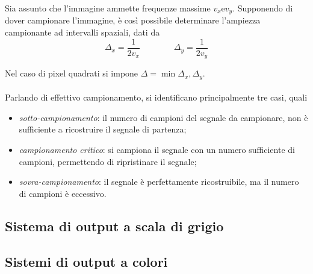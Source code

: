 \documentclass{subfiles}
\begin{document}
Sia assunto che l'immagine ammette frequenze massime \(v_{x} \text{e} v_{y}\).
Supponendo di dover campionare l'immagine, è così possibile determinare l'ampiezza campionante ad intervalli spaziali, dati da
\[
    \Delta_{x} = \frac{1}{2v_{x}} \qquad \qquad \Delta_{y} = \frac{1}{2 v_{y}}
\]

\noindent Nel caso di pixel quadrati si impone \(\Delta = \min{\Delta_{x}, \Delta_{y}}\).
\\ \\
Parlando di effettivo campionamento, si identificano principalmente tre casi, quali
\begin{itemize}
    \item \emph{sotto-campionamento}: il numero di campioni del segnale da campionare, non è sufficiente a ricostruire il segnale di partenza;
    \item \emph{campionamento critico}: si campiona il segnale con un numero sufficiente di campioni, permettendo di ripristinare il segnale;
    \item \emph{sovra-campionamento}: il segnale è perfettamente ricostruibile, ma il numero di campioni è eccessivo.
\end{itemize}

\subsection{Sistema di output a scala di grigio}


\subsection{Sistemi di output a colori}

\clearpage
\end{document}
